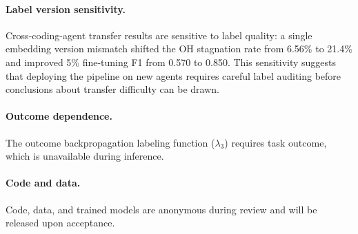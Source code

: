 \paragraph{Label version sensitivity.}
Cross-coding-agent transfer results are sensitive to label quality: a single embedding version mismatch shifted the OH stagnation rate from 6.56\% to 21.4\% and improved 5\% fine-tuning F1 from 0.570 to 0.850.
This sensitivity suggests that deploying the pipeline on new agents requires careful label auditing before conclusions about transfer difficulty can be drawn.

\paragraph{Outcome dependence.}
The outcome backpropagation labeling function ($\lambda_3$) requires task outcome, which is unavailable during inference.

\paragraph{Code and data.}
Code, data, and trained models are anonymous during review and will be released upon acceptance.
